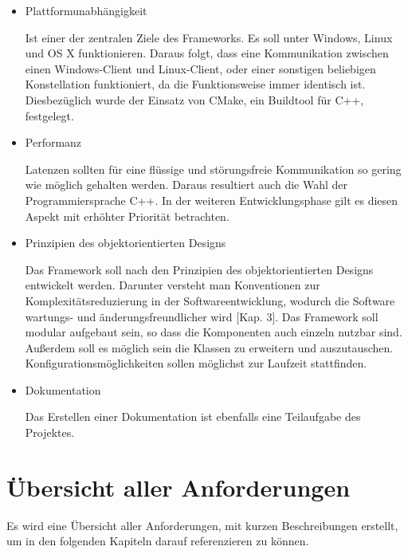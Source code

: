 \begin{itemize} 
\item Plattformunabhängigkeit

Ist einer der zentralen Ziele des Frameworks. Es soll unter Windows, Linux und OS X funktionieren. Daraus folgt, dass eine Kommunikation zwischen einen Windows-Client und Linux-Client, oder einer sonstigen beliebigen Konstellation funktioniert, da die Funktionsweise immer identisch ist. Diesbezüglich wurde der Einsatz von CMake, ein Buildtool für C++, festgelegt.
		
\item Performanz

Latenzen sollten für eine flüssige und störungsfreie Kommunikation so gering wie möglich gehalten werden. Daraus resultiert auch die Wahl der Programmiersprache C++. In der weiteren Entwicklungsphase gilt es diesen Aspekt mit erhöhter Priorität betrachten.
		
\item Prinzipien des objektorientierten Designs

Das Framework soll nach den Prinzipien des objektorientierten Designs entwickelt werden. Darunter versteht man Konventionen zur Komplexitätsreduzierung in der Softwareentwicklung, wodurch die Software wartungs- und änderungsfreundlicher wird \cite{Lahres2009}[Kap. 3]. Das Framework soll modular aufgebaut sein, so dass die Komponenten auch einzeln nutzbar sind. Außerdem soll es möglich sein die Klassen zu erweitern und auszutauschen. Konfigurationsmöglichkeiten sollen möglichst zur Laufzeit stattfinden. 
		
\item Dokumentation

Das Erstellen einer Dokumentation ist ebenfalls eine Teilaufgabe des Projektes.
		
\end{itemize}

\newpage
\section{Übersicht aller Anforderungen}
Es wird eine Übersicht aller Anforderungen, mit kurzen Beschreibungen erstellt, um in den folgenden Kapiteln darauf referenzieren zu können.

